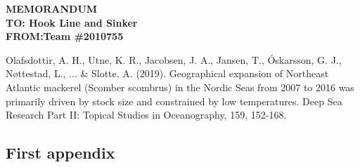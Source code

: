 \documentclass{mcmthesis}
\begin{document}
\textbf{MEMORANDUM}~\\
\textbf{TO: Hook Line and Sinker}\\
\textbf{FROM:Team \#2010755}\\
\begin{thebibliography}{99}
 Olafsdottir, A. H., Utne, K. R., Jacobsen, J. A., Jansen, T., Óskarsson, G. J., Nøttestad, L., ... \& Slotte, A. (2019). Geographical expansion of Northeast Atlantic mackerel (Scomber scombrus) in the Nordic Seas from 2007 to 2016 was primarily driven by stock size and constrained by low temperatures. Deep Sea Research Part II: Topical Studies in Oceanography, 159, 152-168.
\end{thebibliography}

\begin{appendices}

\section{First appendix}

\end{appendices}
\end{document}
